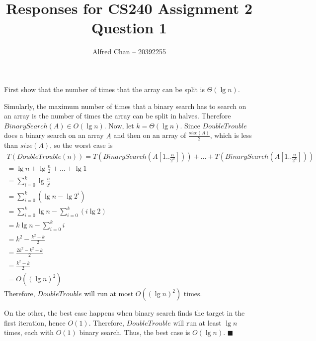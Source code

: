 \documentclass[12pt]{article}
\title{Responses for CS240 Assignment 2 Question 1}
\author{Alfred Chan -- 20392255}
\begin{document}
\maketitle
First show that the number of times that the array can be split is $\Theta(\lg n)$.

Simularly, the maximum number of times that a binary search has to search on an array is the number of times the array can be split in halves.
Therefore $BinarySearch(A) \in O(\lg n)$.
Now, let $k = \Theta(\lg n)$.
Since $DoubleTrouble$ does a binary search on an array $A$ and then on an array of $\frac{size(A)}{2}$, which is less than $size(A)$, so the worst case is
\begin{gather*}
T(DoubleTrouble(n)) = T(BinarySearch(A[1..\frac{n}{2^0}])) + \dots + T(BinarySearch(A[1 .. \frac{n}{2^k}]))\\
	= \lg n + \lg\frac{n}{2} + \dots + \lg 1\\
	= \sum_{i=0}^{k} \lg \frac{n}{2^i}\\
	= \sum_{i=0}^{k} (\lg n - \lg 2^{i})\\
	= \sum_{i=0}^{k} \lg n - \sum_{i=0}^{k} (i \lg 2)\\
	= k\lg n - \sum_{i=0}^{k} i\\
	= k^2 - \frac{k^2 + k}{2}\\
	= \frac{2k^2 - k^2 - k}{2}\\
	= \frac{k^2 - k}{2}\\
	= O((\lg n)^2)
\end{gather*}
Therefore, $DoubleTrouble$ will run at most $O((\lg n)^2)$ times.

On the other, the best case happens when binary search finds the target in the first iteration, hence $O(1)$.
Therefore, $DoubleTrouble$ will run at least $\lg n$ times, each with $O(1)$ binary search.
Thus, the best case is $O(\lg n)$.
\hfill $\blacksquare$
\end{document}
